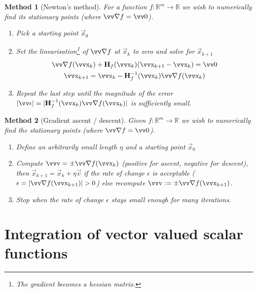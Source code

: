 \documentclass[twocolumn, margin=small]{tex/hsrzf}
\theoremstyle{fuvarzf}
\newtheorem{method}{Method}
\begin{document}
\begin{method}[Newton's method]
  For a function \(f:\mathbb{R}^m\to\mathbb{R}\) we wish to numerically find
  its stationary points (where \(\grad f = \vec{0}\)).
  \begin{enumerate}
    \item Pick a starting point \(\vec{x}_0\)
    \item Set the linearisation\footnote{The gradient becomes a hessian matrix.}
      of \(\grad f\) at \(\vec{x}_k\) to zero and
      solve for \(\vec{x}_{k+1}\)
      \begin{gather*}
        \grad f(\vec{x}_k) + \mx{H}_f (\vec{x}_k)
          (\vec{x}_{k+1} - \vec{x}_k) = \vec{0} \\
          \vec{x}_{k+1} = \vec{x}_k - \mx{H}_f^{-1} (\vec{x}_k) \grad f(\vec{x}_k)
      \end{gather*}
    \item Repeat the last step until the magnitude of the error
      \(|\vec{\epsilon}| = |\mx{H}_f^{-1} (\vec{x}_k) \grad f(\vec{x}_k)|\) is
      sufficiently small.
  \end{enumerate}
\end{method}

\begin{method}[Gradient ascent / descent]
  Given \(f:\mathbb{R}^m\to\mathbb{R}\) we wish to numerically find
  the stationary points (where \(\grad f = \vec{0}\)).
  \begin{enumerate}
    \item Define an arbitrarily small length \(\eta\) and a starting point
      \(\vec{x}_0\)
    \item Compute \(\vec{v} = \pm\grad f(\vec{x}_k)\) (positive for ascent,
      negative for descent), then \(\vec{x}_{k+1} = \vec{x}_k + \eta\vec{v}\)
      if the rate of change \(\epsilon\) is acceptable (\(\epsilon = |\grad
      f(\vec{x}_{k+1})| > 0\)) else recompute \(\vec{v} := \pm \grad
      f(\vec{x}_{k+1})\).
    \item Stop when the rate of change \(\epsilon\) stays small enough for many
      iterations.
  \end{enumerate}
\end{method}

\section{Integration of vector valued scalar functions}
\end{document}
